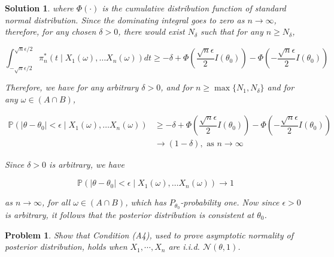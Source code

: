 \documentclass[12pt]{article}
\theoremstyle{problemstyle}
\newtheorem{pbm}{Problem}
\newtheorem*{solution*}{Solution}
\newenvironment{problem}{
\begin{tcolorbox}[colback=green!10!white,colframe=black!75!black, parbox = false]\begin{pbm} }{\end{pbm}\end{tcolorbox} }
\newcommand{\prob}{\mathbb{P}}
\newcommand{\normal}{\mathcal{N}}
\begin{document}
\begin{solution*}
    where $\Phi(\cdot)$ is the cumulative distribution function of standard normal distribution. Since the dominating integral goes to zero as $n \rightarrow \infty$, therefore, for any chosen $\delta > 0$, there would exist $N_{\delta}$ such that for any $n \geq N_{\delta}$, 

    \begin{equation*}
        \int_{-\sqrt{n}\epsilon/2}^{\sqrt{n}\epsilon/2} \pi_n^\ast(t \mid X_1(\omega), \dots X_n(\omega)) dt
        \geq -\delta + \Phi\left( \dfrac{\sqrt{n}\epsilon}{2}I(\theta_0) \right) - \Phi\left(-\dfrac{\sqrt{n}\epsilon}{2}I(\theta_0) \right)
    \end{equation*}

    Therefore, we have for any arbitrary $\delta > 0$, and for $n \geq \max\{ N_1, N_\delta \}$ and for any $\omega \in (A \cap B)$,

    \begin{align*}
        \prob(\vert \theta - \theta_0 \vert < \epsilon \mid X_1(\omega), \dots X_n(\omega))
        & \geq -\delta + \Phi\left( \dfrac{\sqrt{n}\epsilon}{2}I(\theta_0) \right) - \Phi\left(-\dfrac{\sqrt{n}\epsilon}{2}I(\theta_0) \right)\\
        & \rightarrow (1 - \delta), \text{ as } n \rightarrow \infty  
    \end{align*}

    Since $\delta > 0$ is arbitrary, we have  

    $$
    \prob(\vert \theta - \theta_0 \vert < \epsilon \mid X_1(\omega), \dots X_n(\omega)) \rightarrow 1
    $$

    as $n \rightarrow \infty$, for all $\omega \in (A \cap B)$, which has $P_{\theta_0}$-probability one. Now since $\epsilon > 0$ is arbitrary, it follows that the posterior distribution is consistent at $\theta_0$.

\end{solution*}
\pagebreak


\begin{problem}
Show that Condition (A4), used to prove asymptotic normality of posterior distribution, holds when $X_1,\cdots, X_n$ are i.i.d. $\normal(\theta, 1)$.
\end{problem}
\end{document}
